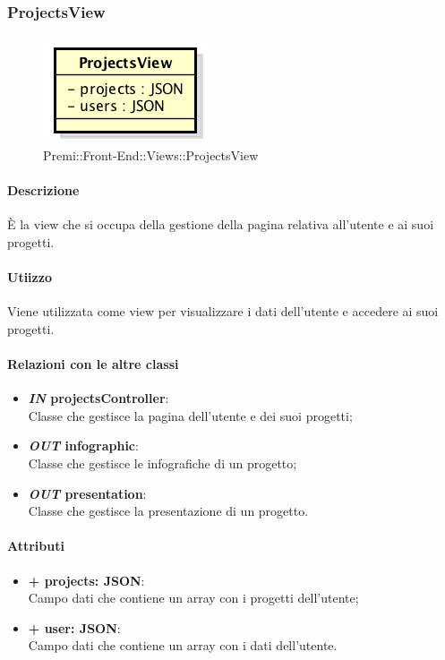 \subsubsection{ProjectsView}
	\begin{figure}[h]
		\centering
		\includegraphics[width=0.4\linewidth]{img/premi_front_end_views_projectsview}
		\caption[Premi::Front-End::Views::ProjectsView]{Premi::Front-End::Views::ProjectsView}
	\end{figure}
	
	\paragraph{Descrizione}
	È la view che si occupa della gestione della pagina relativa all'utente e ai suoi progetti.
	
	\paragraph{Utiizzo}
	Viene utilizzata come view per visualizzare i dati dell'utente e accedere ai suoi progetti.
	
	\paragraph{Relazioni con le altre classi}
	\begin{itemize}
		\item \textbf{\textit{IN} projectsController}:\\
		Classe che gestisce la pagina dell'utente e dei suoi progetti;
		\item \textbf{\textit{OUT} infographic}:\\
		Classe che gestisce le infografiche di un progetto;
		\item \textbf{\textit{OUT} presentation}:\\
		Classe che gestisce la presentazione di un progetto.
	\end{itemize}
	
	\paragraph{Attributi}
	\begin{itemize}
		\item \textbf{+ projects: JSON}:\\
		Campo dati che contiene un array con i progetti dell'utente;
		\item \textbf{+ user: JSON}:\\
		Campo dati che contiene un array con i dati dell'utente.
	\end{itemize}
	
